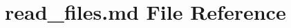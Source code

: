 \hypertarget{read__files_8md}{}\section{read\+\_\+files.\+md File Reference}
\label{read__files_8md}
